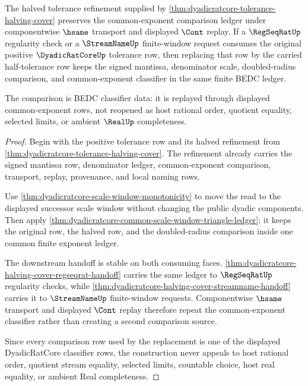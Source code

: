 \begin{theorem}
\label{thm:dyadicratcore-common-exponent-transport}
The halved tolerance refinement supplied by
\autoref{thm:dyadicratcore-tolerance-halving-cover} preserves the
common-exponent comparison ledger under componentwise $\hsame$ transport and
displayed $\Cont$ replay. If a $\RegSeqRatUp$ regularity check or a
$\StreamNameUp$ finite-window request consumes the original positive
$\DyadicRatCoreUp$ tolerance row, then replacing that row by the carried
half-tolerance row keeps the signed mantissa, denominator scale, doubled-radius
comparison, and common-exponent classifier in the same finite BEDC ledger.

The comparison is BEDC classifier data: it is replayed through displayed
common-exponent rows, not reopened as host rational order, quotient equality,
selected limits, or ambient $\RealUp$ completeness.
\end{theorem}
\begin{proof}
Begin with the positive tolerance row and its halved refinement from
\autoref{thm:dyadicratcore-tolerance-halving-cover}. The refinement already
carries the signed mantissa row, denominator ledger, common-exponent comparison,
transport, replay, provenance, and local naming rows.

Use \autoref{thm:dyadicratcore-scale-window-monotonicity} to move the read to
the displayed successor scale window without changing the public dyadic
components. Then apply
\autoref{thm:dyadicratcore-common-scale-window-triangle-ledger}; it keeps the
original row, the halved row, and the doubled-radius comparison inside one
common finite exponent ledger.

The downstream handoff is stable on both consuming faces.
\autoref{thm:dyadicratcore-halving-cover-regseqrat-handoff} carries the same
ledger to $\RegSeqRatUp$ regularity checks, while
\autoref{thm:dyadicratcore-halving-cover-streamname-handoff} carries it to
$\StreamNameUp$ finite-window requests. Componentwise $\hsame$ transport and
displayed $\Cont$ replay therefore repeat the common-exponent classifier
rather than creating a second comparison source.

Since every comparison row used by the replacement is one of the displayed
DyadicRatCore classifier rows, the construction never appeals to host rational
order, quotient stream equality, selected limits, countable choice, host real
equality, or ambient Real completeness.
\end{proof}

